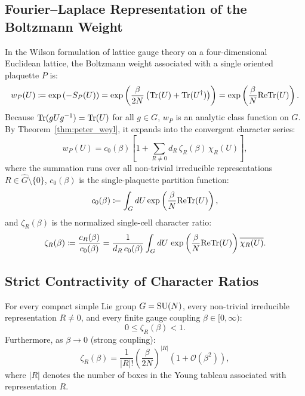 \subsection{Fourier--Laplace Representation of the Boltzmann Weight}
\label{subsec:boltzmann_character_expansion}

In the Wilson formulation of lattice gauge theory on a four-dimensional Euclidean lattice, the Boltzmann weight associated with a single oriented plaquette $P$ is:
\begin{equation}
\label{eq:plaquette_boltzmann_app}
w_P(U) \coloneqq \exp\left( -S_P(U) \right) = \exp\left( \frac{\beta}{2N} \left( \mathrm{Tr}(U) + \mathrm{Tr}(U^\dagger) \right) \right) = \exp\left( \frac{\beta}{N} \mathrm{Re} \mathrm{Tr}(U) \right).
\end{equation}
Because $\mathrm{Tr}(g U g^{-1}) = \mathrm{Tr}(U)$ for all $g \in G$, $w_P$ is an analytic class function on $G$. By Theorem~\ref{thm:peter_weyl}, it expands into the convergent character series:
\begin{equation}
\label{eq:boltzmann_char_series}
w_P(U) = c_0(\beta) \left[ 1 + \sum_{R \neq 0} d_R \, \zeta_R(\beta) \, \chi_R(U) \right],
\end{equation}
where the summation runs over all non-trivial irreducible representations $R \in \widehat{G} \setminus \{0\}$, $c_0(\beta)$ is the single-plaquette partition function:
\begin{equation}
\label{eq:c0_def_app}
c_0(\beta) \coloneqq \int_G dU \exp\left( \frac{\beta}{N} \mathrm{Re} \mathrm{Tr}(U) \right),
\end{equation}
and $\zeta_R(\beta)$ is the normalized single-cell character ratio:
\begin{equation}
\label{eq:character_ratio_def}
\zeta_R(\beta) \coloneqq \frac{c_R(\beta)}{c_0(\beta)} = \frac{1}{d_R \, c_0(\beta)} \int_G dU \, \exp\left( \frac{\beta}{N} \mathrm{Re} \mathrm{Tr}(U) \right) \overline{\chi_R(U)}.
\end{equation}

\subsection{Strict Contractivity of Character Ratios}
\label{subsec:strict_contractivity_proof}

\begin{proposition}
\label{prop:character_ratio_bound}
For every compact simple Lie group $G = \mathrm{SU}(N)$, every non-trivial irreducible representation $R \neq 0$, and every finite gauge coupling $\beta \in [0, \infty)$:
\begin{equation}
\label{eq:zeta_strict_less_one}
0 \le \zeta_R(\beta) < 1.
\end{equation}
Furthermore, as $\beta \to 0$ (strong coupling):
\begin{equation}
\label{eq:strong_coupling_zeta_scaling}
\zeta_R(\beta) = \frac{1}{|R|!} \left( \frac{\beta}{2N} \right)^{|R|} \left( 1 + \mathcal{O}(\beta^2) \right),
\end{equation}
where $|R|$ denotes the number of boxes in the Young tableau associated with representation $R$.
\end{proposition}

